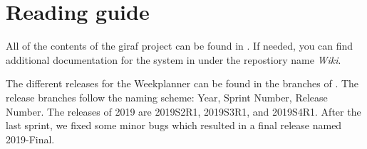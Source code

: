 \section{Reading guide}

All of the contents of the \gls{giraf} project can be found in \cite{giraf_github_organization_page}. If needed, you can find additional documentation for the system in \cite{giraf_github_organization_page} under the repostiory name \textit{Wiki}.

The different releases for the Weekplanner can be found in the branches of \cite{giraf_weekplanner}. The release branches follow the naming scheme: Year, Sprint Number, Release Number. The releases of 2019 are 2019S2R1, 2019S3R1, and 2019S4R1. After the last sprint, we fixed some minor bugs which resulted in a final release named 2019-Final.